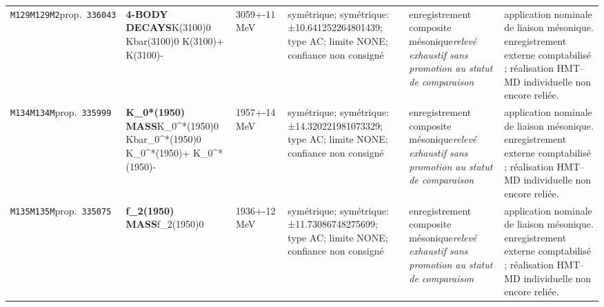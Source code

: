 \begin{landscape}
\begin{longtable}{L{1.85cm}L{4.45cm}L{2.35cm}L{4.05cm}L{3.35cm}L{7.15cm}}
\texttt{M129}\newline \texttt{M129M2}\newline prop.\ \texttt{336043} & \textbf{4-BODY DECAYS}\newline K(3100)0 \textbar{}\allowbreak{} Kbar(3100)0 \textbar{}\allowbreak{} K(3100)+ \textbar{}\allowbreak{} K(3100)- & 3059+-11\,MeV & symétrique; symétrique: ±10.641252264801439; type AC; limite NONE; confiance non consigné & enregistrement composite mésonique\newline \emph{relevé exhaustif sans promotion au statut de comparaison} & application nominale de liaison mésonique. enregistrement externe comptabilisé ; réalisation HMT--MD individuelle non encore reliée. \\
\texttt{M134}\newline \texttt{M134M}\newline prop.\ \texttt{335999} & \textbf{K\_\allowbreak{}0*(1950) MASS}\newline K\_\allowbreak{}0\textasciicircum{}*(1950)0 \textbar{}\allowbreak{} Kbar\_\allowbreak{}0\textasciicircum{}*(1950)0 \textbar{}\allowbreak{} K\_\allowbreak{}0\textasciicircum{}*(1950)+ \textbar{}\allowbreak{} K\_\allowbreak{}0\textasciicircum{}*(1950)- & 1957+-14\,MeV & symétrique; symétrique: ±14.320221981073329; type AC; limite NONE; confiance non consigné & enregistrement composite mésonique\newline \emph{relevé exhaustif sans promotion au statut de comparaison} & application nominale de liaison mésonique. enregistrement externe comptabilisé ; réalisation HMT--MD individuelle non encore reliée. \\
\texttt{M135}\newline \texttt{M135M}\newline prop.\ \texttt{335075} & \textbf{f\_\allowbreak{}2(1950) MASS}\newline f\_\allowbreak{}2(1950)0 & 1936+-12\,MeV & symétrique; symétrique: ±11.73086748275699; type AC; limite NONE; confiance non consigné & enregistrement composite mésonique\newline \emph{relevé exhaustif sans promotion au statut de comparaison} & application nominale de liaison mésonique. enregistrement externe comptabilisé ; réalisation HMT--MD individuelle non encore reliée. \\

\end{longtable}
\end{landscape}
